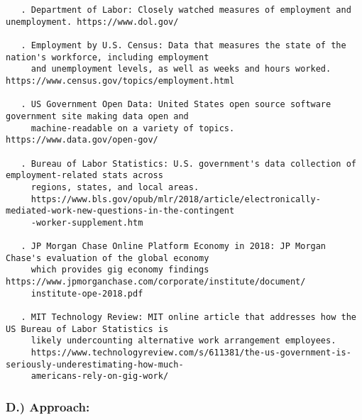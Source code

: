 \documentclass[]{article}
\begin{document}
\begin{verbatim}
   . Department of Labor: Closely watched measures of employment and unemployment. https://www.dol.gov/
   
   . Employment by U.S. Census: Data that measures the state of the nation's workforce, including employment
     and unemployment levels, as well as weeks and hours worked. https://www.census.gov/topics/employment.html
     
   . US Government Open Data: United States open source software government site making data open and 
     machine-readable on a variety of topics. https://www.data.gov/open-gov/
     
   . Bureau of Labor Statistics: U.S. government's data collection of employment-related stats across 
     regions, states, and local areas. 
     https://www.bls.gov/opub/mlr/2018/article/electronically-mediated-work-new-questions-in-the-contingent
     -worker-supplement.htm
     
   . JP Morgan Chase Online Platform Economy in 2018: JP Morgan Chase's evaluation of the global economy 
     which provides gig economy findings https://www.jpmorganchase.com/corporate/institute/document/
     institute-ope-2018.pdf
     
   . MIT Technology Review: MIT online article that addresses how the US Bureau of Labor Statistics is 
     likely undercounting alternative work arrangement employees.      
     https://www.technologyreview.com/s/611381/the-us-government-is-seriously-underestimating-how-much-
     americans-rely-on-gig-work/
\end{verbatim}

\subsubsection{D.) Approach:}\label{d.-approach}
\end{document}
